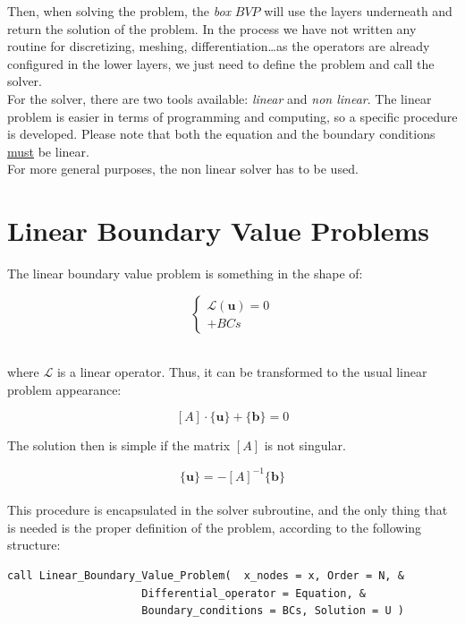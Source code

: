 Then, when solving the problem, the \textit{box} $BVP$ will use the layers
underneath and return the solution of the problem. In the process we have not
written any routine for discretizing, meshing, differentiation\ldots  as the
operators are already configured in the lower layers, we just need to define
the problem and call the solver. \\

For the solver, there are two tools available: \textit{linear} and \textit{non
linear}. The linear problem is easier in terms of programming and computing, so
a specific procedure is developed. Please note that both the equation and the
boundary conditions \underline{must} be linear.\\

For more general purposes, the non linear solver has to be used.\\




\section{Linear Boundary Value Problems}

The linear boundary value problem is something in the shape of: 

\begin{Large}


$$\begin{cases}
\mathscr{L}(\mathbf{u})=0\\

+BCs
\end{cases}
$$\\

\end{Large}

where $\mathscr{L}$ is a linear operator. Thus, it can be transformed to the
usual linear problem appearance: 

$$[A]\cdot \{\mathbf{u}\}+\{\mathbf{b}\} =0 $$ 		

The solution then is simple if the matrix $[A]$ is not singular. 

$$\{\mathbf{u}\}=-[A]^{-1}\{\mathbf{b}\} $$ 	\\

This procedure is encapsulated in the solver subroutine, and the only thing that
is needed is the proper definition of the problem, according to the following
structure:\\


\begin{blueframed}
\begin{lstlisting}
call Linear_Boundary_Value_Problem(  x_nodes = x, Order = N, &
                     Differential_operator = Equation, &
                     Boundary_conditions = BCs, Solution = U )

\end{lstlisting}
\end{blueframed}

